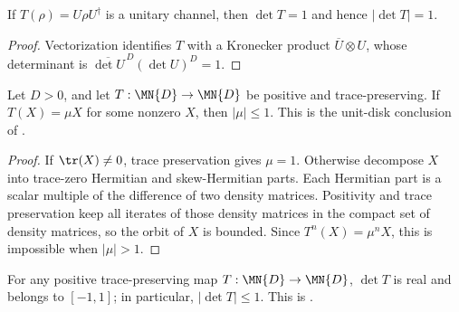 \begin{theorem}
    \label{thm:channel_det_unitary_eq_one}
    \leanok
    If $T(\rho)=U\rho U^\dagger$ is a unitary channel, then
    $\det T=1$ and hence $|\det T|=1$.
\end{theorem}

\begin{proof}\leanok
    Vectorization identifies $T$ with a Kronecker product
    $\overline{U}\otimes U$, whose determinant is
    $\overline{\det U}^{\,D}(\det U)^D=1$.
\end{proof}

\begin{theorem}
    \label{thm:positive_tp_eigenvalue_disk}
    \leanok
    Let $D>0$, and let $T:\MN{D}\to\MN{D}$ be positive and trace-preserving.
    If $T(X)=\mu X$ for some nonzero $X$, then $|\mu|\leq1$.
    This is the unit-disk conclusion of
    \cite[Proposition~6.1]{Wolf2012Quantum}.
\end{theorem}

\begin{proof}\leanok
    If $\tr(X)\neq0$, trace preservation gives $\mu=1$. Otherwise decompose
    $X$ into trace-zero Hermitian and skew-Hermitian parts. Each Hermitian
    part is a scalar multiple of the difference of two density matrices.
    Positivity and trace preservation keep all iterates of those density
    matrices in the compact set of density matrices, so the orbit of $X$ is
    bounded. Since $T^n(X)=\mu^nX$, this is impossible when $|\mu|>1$.
\end{proof}

\begin{theorem}
    \label{thm:channelDet_norm_le_one}
    \leanok
    For any positive trace-preserving map $T : \MN{D} \to \MN{D}$,
    $\det T$ is real and belongs to $[-1,1]$; in particular,
    $|\det T|\leq1$.
    This is \cite[Theorem~6.1(1)]{Wolf2012Quantum}.
\end{theorem}

